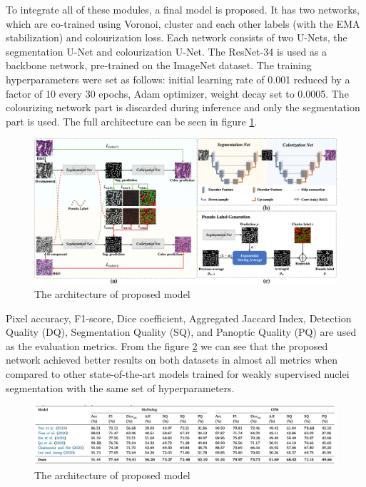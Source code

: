 To integrate all of these modules, a final model is proposed. It has two networks, which are co-trained using Voronoi, cluster and each other labels (with the EMA stabilization) and colourization loss. Each network consists of two U-Nets, the segmentation U-Net and colourization U-Net. The ResNet-34 is used as a backbone network, pre-trained on the ImageNet dataset. The training hyperparameters were set as follows: initial learning rate of 0.001 reduced by a factor of 10 every 30 epochs, Adam optimizer, weight decay set to 0.0005. The colourizing network part is discarded during inference and only the segmentation part is used. The full architecture can be seen in figure \ref{fig:rw-self-sup-arch}.

\begin{figure}[H]
    \begin{centering}
    \includegraphics[width=14cm]{assets/images/rw-selfsup-arch.jpg}
    \par\end{centering}
    \caption{The architecture of proposed model}
    \label{fig:rw-self-sup-arch}
\end{figure}

Pixel accuracy, F1-score, Dice coefficient, Aggregated Jaccard Index, Detection Quality (DQ), Segmentation Quality (SQ), and Panoptic Quality (PQ) are used as the evaluation metrics. From the figure \ref{fig:rw-self-sup-results} we can see that the proposed network achieved better results on both datasets in almost all metrics when compared to other state-of-the-art models trained for weakly supervised nuclei segmentation with the same set of hyperparameters.

\begin{figure}[H]
    \begin{centering}
    \includegraphics[width=14cm]{assets/images/rw-selfsup-results.png}
    \par\end{centering}
    \caption{The architecture of proposed model}
    \label{fig:rw-self-sup-results}
\end{figure}

